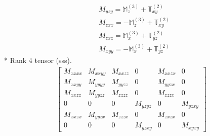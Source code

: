 \documentclass[fleqn,8pt,landscape]{jsarticle}
\begin{document}
\begin{align*}
& M_{yzy} = \mathbb{M}_{z}^{(3)} + \mathbb{T}_{xy}^{(2)} \\
& M_{zxx} = - \mathbb{M}_{z}^{(3)} + \mathbb{T}_{xy}^{(2)} \\
& M_{zxz} = \mathbb{M}_{x}^{(3)} + \mathbb{T}_{yz}^{(2)} \\
& M_{xyy} = - \mathbb{M}_{x}^{(3)} + \mathbb{T}_{yz}^{(2)}
\end{align*}
* Rank 4 tensor (sss).
\begin{align*}
\begin{bmatrix} M_{xxxx} & M_{xxyy} & M_{xxzz} & 0 & M_{xxzx} & 0 \\ M_{xxyy} & M_{yyyy} & M_{yyzz} & 0 & M_{yyzx} & 0 \\ M_{xxzz} & M_{yyzz} & M_{zzzz} & 0 & M_{zzzx} & 0 \\ 0 & 0 & 0 & M_{yzyz} & 0 & M_{yzxy} \\ M_{xxzx} & M_{yyzx} & M_{zzzx} & 0 & M_{zxzx} & 0 \\ 0 & 0 & 0 & M_{yzxy} & 0 & M_{xyxy} \end{bmatrix}
\end{align*}
\end{document}
